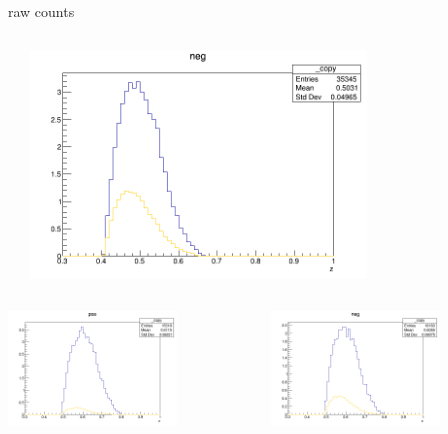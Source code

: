 \begin{frame}{raw counts}
\begin{columns}
\begin{column}[T]{0.25\textwidth}
\end{column}
\begin{column}[T]{0.25\textwidth}
\includegraphics[width = 0.7\textwidth]{results/yield/statistics/yield_x_Q2_z_0.65_5.500_0.50_neg.png}
\end{column}
\end{columns}
\begin{columns}
\begin{column}[T]{0.25\textwidth}
\includegraphics[width = 0.7\textwidth]{results/yield/statistics/yield_x_Q2_z_0.65_5.500_0.60_pos.png}
\end{column}
\begin{column}[T]{0.25\textwidth}
\includegraphics[width = 0.7\textwidth]{results/yield/statistics/yield_x_Q2_z_0.65_5.500_0.60_neg.png}

\end{column}
\end{columns}
\end{frame}
